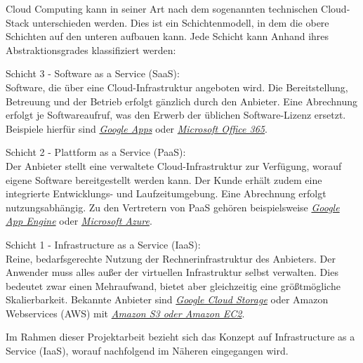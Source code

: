 \documentclass[13pt,a4paper,bibliography=totocnumbered,listof=totocnumbered]{scrartcl}
\begin{document}
Cloud Computing kann in seiner Art nach dem sogenannten technischen Cloud-Stack unterschieden werden. Dies ist ein Schichtenmodell, in dem die obere Schichten auf den unteren aufbauen kann. Jede Schicht kann Anhand ihres Abstraktionsgrades klassifiziert werden:

\begin{compactitem}
\item Schicht 3 - Software as a Service (SaaS):\\
Software, die über eine Cloud-Infrastruktur angeboten wird. Die Bereitstellung, Betreuung und der Betrieb erfolgt gänzlich durch den Anbieter. Eine Abrechnung erfolgt je Softwareaufruf, was den Erwerb der üblichen Software-Lizenz ersetzt. Beispiele hierfür sind \href{http://www.google.com/enterprise/apps/business/}{\textit{Google Apps}} oder \href{http://office.microsoft.com/de-de/business/was-ist-office-365-fur-unternehmen-FX102997580.aspx}{\textit{Microsoft Office 365}}.
\item Schicht 2 - Plattform as a Service (PaaS):\\
Der Anbieter stellt eine verwaltete Cloud-Infrastruktur zur Verfügung, worauf eigene Software bereitgestellt werden kann. Der Kunde erhält zudem eine integrierte Entwicklungs- und Laufzeitumgebung. Eine Abrechnung erfolgt nutzungsabhängig. Zu den Vertretern von PaaS gehören beispielsweise \href{https://cloud.google.com/appengine/}{\textit{Google App Engine}} oder \href{http://azure.microsoft.com/de-de/}{\textit{Microsoft Azure}}.
\item Schicht 1 - Infrastructure as a Service (IaaS):\\
Reine, bedarfsgerechte Nutzung der Rechnerinfrastruktur des Anbieters. Der Anwender muss alles außer der virtuellen Infrastruktur selbst verwalten. Dies bedeutet zwar einen Mehraufwand, bietet aber gleichzeitig eine größtmögliche Skalierbarkeit. Bekannte Anbieter sind \href{https://cloud.google.com/storage/}{\textit{Google Cloud Storage}} oder Amazon Webservices (AWS) mit \href{http://aws.amazon.com/de/}{\textit{Amazon S3 oder Amazon EC2}}.
\end{compactitem}

\cite{35} \cite[S. 65f.]{41} \cite[S. 2f]{34}

Im Rahmen dieser Projektarbeit bezieht sich das Konzept auf Infrastructure as a Service (IaaS), worauf nachfolgend im Näheren eingegangen wird.
\end{document}
